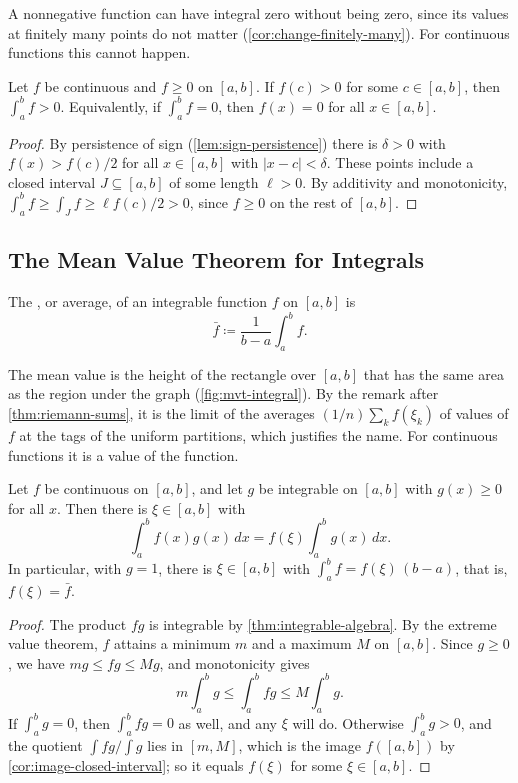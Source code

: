 A nonnegative function can have integral zero without being zero, since its values at finitely many points do not matter (\cref{cor:change-finitely-many}). For continuous functions this cannot happen.

\begin{proposition}
\label{prop:positive-integral}
Let $f$ be continuous and $f\ge0$ on $[a,b]$. If $f(c)>0$ for some $c\in[a,b]$, then $\int_a^bf>0$. Equivalently, if $\int_a^bf=0$, then $f(x)=0$ for all $x\in[a,b]$.
\end{proposition}

\begin{proof}
By persistence of sign (\cref{lem:sign-persistence}) there is $\delta>0$ with $f(x)>f(c)/2$ for all $x\in[a,b]$ with $|x-c|<\delta$. These points include a closed interval $J\subseteq[a,b]$ of some length $\ell>0$. By additivity and monotonicity, $\int_a^bf\ge\int_Jf\ge\ell f(c)/2>0$, since $f\ge0$ on the rest of $[a,b]$.
\end{proof}

\subsection{The Mean Value Theorem for Integrals}

\begin{definition}
\label{def:mean-value}
The , or average, of an integrable function $f$ on $[a,b]$ is
\[
\bar f\coloneqq\frac1{b-a}\int_a^bf .
\]
\end{definition}

The mean value is the height of the rectangle over $[a,b]$ that has the same area as the region under the graph (\cref{fig:mvt-integral}). By the remark after \cref{thm:riemann-sums}, it is the limit of the averages $(1/n)\sum_kf(\xi_k)$ of values of $f$ at the tags of the uniform partitions, which justifies the name. For continuous functions it is a value of the function.

\begin{theorem}
\label{thm:mvt-integral}
Let $f$ be continuous on $[a,b]$, and let $g$ be integrable on $[a,b]$ with $g(x)\ge0$ for all $x$. Then there is $\xi\in[a,b]$ with
\[
\int_a^bf(x)g(x)\,dx=f(\xi)\int_a^bg(x)\,dx .
\]
In particular, with $g=1$, there is $\xi\in[a,b]$ with $\int_a^bf=f(\xi)\,(b-a)$, that is, $f(\xi)=\bar f$.
\end{theorem}

\begin{proof}
The product $fg$ is integrable by \cref{thm:integrable-algebra}. By the extreme value theorem, $f$ attains a minimum $m$ and a maximum $M$ on $[a,b]$. Since $g\ge0$, we have $mg\le fg\le Mg$, and monotonicity gives
\[
m\int_a^bg\le\int_a^bfg\le M\int_a^bg .
\]
If $\int_a^bg=0$, then $\int_a^bfg=0$ as well, and any $\xi$ will do. Otherwise $\int_a^bg>0$, and the quotient $\int fg/\int g$ lies in $[m,M]$, which is the image $f([a,b])$ by \cref{cor:image-closed-interval}; so it equals $f(\xi)$ for some $\xi\in[a,b]$.
\end{proof}

